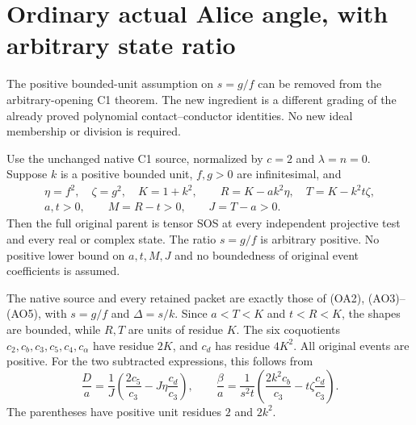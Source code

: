 \section{\texorpdfstring{Ordinary actual Alice angle, with arbitrary state ratio}{Ordinary actual Alice angle, with arbitrary state ratio}}
\label{component:p9f00f949fc8c}

\label{p9f00f949fc8c:sec:c1-arbitrary-state-ratio}

The positive bounded-unit assumption on $s=g/f$ can be removed from
the arbitrary-opening C1 theorem. The new ingredient is a different
grading of the already proved polynomial contact--conductor identities.
No new ideal membership or division is required.

\begin{theorem}
Use the unchanged native C1 source, normalized by $c=2$ and
$\lambda=n=0$. Suppose $k$ is a positive bounded unit, $f,g>0$ are
infinitesimal, and
\[
 \begin{gathered}
 \eta=f^2,\quad\zeta=g^2,\quad K=1+k^2,\qquad
 R=K-ak^2\eta,\quad T=K-k^2t\zeta,\\
 a,t>0,\qquad M=R-t>0,\qquad J=T-a>0.
 \end{gathered}
 \tag{AS1}
\]
Then the full original parent is tensor SOS at every independent
projective test and every real or complex state. The ratio $s=g/f$
is arbitrary positive. No positive lower bound on $a,t,M,J$ and no
boundedness of original event coefficients is assumed.
\end{theorem}

The native source and every retained packet are exactly those of
(OA2), (AO3)--(AO5), with $s=g/f$ and $\Delta=s/k$. Since
$a<T<K$ and $t<R<K$, the shapes are bounded, while $R,T$ are units
of residue $K$. The six coquotients $c_2,c_b,c_3,c_5,c_4,c_\alpha$
have residue $2K$, and $c_d$ has residue $4K^2$.
All original events are positive. For the two subtracted expressions,
this follows from
\[
 \frac Da=\frac1J\left(\frac{2c_5}{c_3}
                   -J\eta\frac{c_d}{c_3}\right),\qquad
 \frac\beta a=\frac1{s^2t}
      \left(\frac{2k^2c_b}{c_3}-t\zeta\frac{c_d}{c_3}\right).
 \tag{AS2}
\]
The parentheses have positive unit residues $2$ and $2k^2$.

